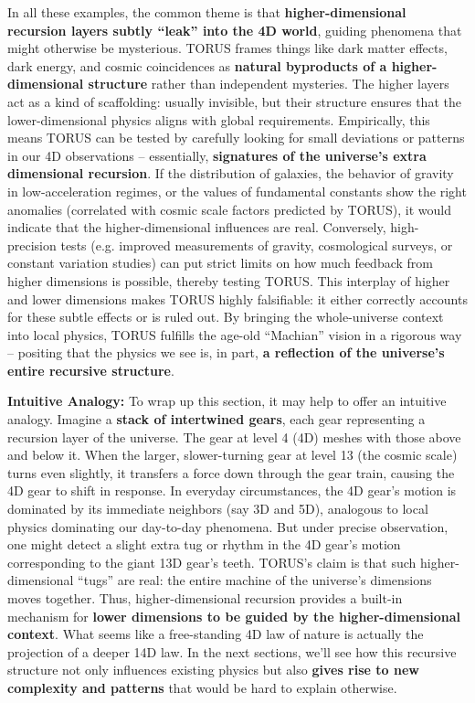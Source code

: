In all these examples, the common theme is that
\textbf{higher-dimensional recursion layers subtly ``leak'' into the 4D
world}, guiding phenomena that might otherwise be mysterious. TORUS
frames things like dark matter effects, dark energy, and cosmic
coincidences as \textbf{natural byproducts of a higher-dimensional
structure} rather than independent mysteries. The higher layers act as a
kind of scaffolding: usually invisible, but their structure ensures that
the lower-dimensional physics aligns with global requirements.
Empirically, this means TORUS can be tested by carefully looking for
small deviations or patterns in our 4D observations -- essentially,
\textbf{signatures of the universe's extra dimensional recursion}. If
the distribution of galaxies, the behavior of gravity in
low-acceleration regimes, or the values of fundamental constants show
the right anomalies (correlated with cosmic scale factors predicted by
TORUS), it would indicate that the higher-dimensional influences are
real. Conversely, high-precision tests (e.g. improved measurements of
gravity, cosmological surveys, or constant variation studies) can put
strict limits on how much feedback from higher dimensions is possible,
thereby testing TORUS. This interplay of higher and lower dimensions
makes TORUS highly falsifiable: it either correctly accounts for these
subtle effects or is ruled out. By bringing the whole-universe context
into local physics, TORUS fulfills the age-old ``Machian'' vision in a
rigorous way -- positing that the physics we see is, in part, \textbf{a
reflection of the universe's entire recursive structure}.

\textbf{Intuitive Analogy:} To wrap up this section, it may help to
offer an intuitive analogy. Imagine a \textbf{stack of intertwined
gears}, each gear representing a recursion layer of the universe. The
gear at level 4 (4D) meshes with those above and below it. When the
larger, slower-turning gear at level 13 (the cosmic scale) turns even
slightly, it transfers a force down through the gear train, causing the
4D gear to shift in response. In everyday circumstances, the 4D gear's
motion is dominated by its immediate neighbors (say 3D and 5D),
analogous to local physics dominating our day-to-day phenomena. But
under precise observation, one might detect a slight extra tug or rhythm
in the 4D gear's motion corresponding to the giant 13D gear's teeth.
TORUS's claim is that such higher-dimensional ``tugs'' are real: the
entire machine of the universe's dimensions moves together. Thus,
higher-dimensional recursion provides a built-in mechanism for
\textbf{lower dimensions to be guided by the higher-dimensional
context}. What seems like a free-standing 4D law of nature is actually
the projection of a deeper 14D law. In the next sections, we'll see how
this recursive structure not only influences existing physics but also
\textbf{gives rise to new complexity and patterns} that would be hard to
explain otherwise.

